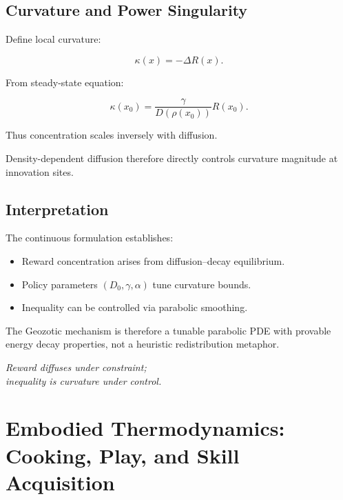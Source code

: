 \documentclass[12pt,a4paper]{article}
\theoremstyle{definition}
\begin{document}
\subsection{Curvature and Power Singularity}

Define local curvature:

\begin{equation}
  \kappa(x) = -\Delta R(x).
\end{equation}

From steady-state equation:

\begin{equation}
  \kappa(x_0)
  =
  \frac{\gamma}{D(\rho(x_0))} R(x_0).
\end{equation}

Thus concentration scales inversely with diffusion.

Density-dependent diffusion therefore directly
controls curvature magnitude at innovation sites.

\subsection{Interpretation}

The continuous formulation establishes:

\begin{itemize}
  \item Reward concentration arises from diffusion–decay equilibrium.
  \item Policy parameters $(D_0,\gamma,\alpha)$ tune curvature bounds.
  \item Inequality can be controlled via parabolic smoothing.
\end{itemize}

The Geozotic mechanism is therefore a tunable
parabolic PDE with provable energy decay properties,
not a heuristic redistribution metaphor.

\medskip
\begin{center}
  \itshape
  Reward diffuses under constraint;\\
  inequality is curvature under control.
\end{center}



\section{Embodied Thermodynamics: Cooking, Play, and Skill Acquisition}
\label{sec:embodied}
\end{document}
